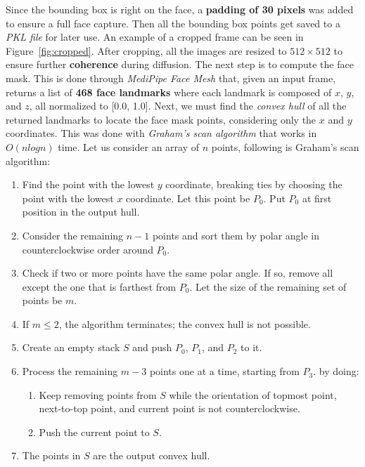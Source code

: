 \documentclass[preprint]{elsarticle}
\begin{document}
Since the bounding box is right on the face, a \textbf{padding of 30 pixels} was added to ensure a full face capture.
Then all the bounding box points get saved to a \emph{PKL file} for later use. 
An example of a cropped frame can be seen in Figure~\ref{fig:cropped}.
After cropping, all the images are resized to $512 \times 512$ to ensure further \textbf{coherence} during diffusion. 
The next step is to compute the face mask. 
This is done through \emph{MediPipe Face Mesh} that, given an input frame, returns a list of \textbf{468 face landmarks} 
where each landmark is composed of $x$, $y$, and $z$, all normalized to  [0.0, 1.0]. 
Next, we must find the \emph{convex hull} of all the returned landmarks to locate the face mask points, considering only the $x$ and $y$ coordinates. 
This was done with \emph{Graham's scan algorithm} \cite{GRAHAM1972132} that works in $O(n log n)$ time. Let us consider an array of $n$ points, following is Graham's scan algorithm:



\begin{enumerate}
	\item Find the point with the lowest $y$ coordinate, breaking ties by choosing the point with the lowest $x$ coordinate. 
	Let this point be $P_0$. Put $P_0$ at first position in the output hull.
	\item Consider the remaining $n-1$ points and sort them by polar angle in counterclockwise order around $P_0$.
	\item Check if two or more points have the same polar angle. If so, remove all except the one that is farthest from $P_0$. 
	Let the size of the remaining set of points be $m$.
	\item If $m \leq 2$, the algorithm terminates; the convex hull is not possible.
	\item Create an empty stack $S$ and push $P_0$, $P_1$, and $P_2$ to it.
	\item Process the remaining $m-3$ points one at a time, starting from $P_3$. by doing:
	\begin{enumerate}
		\item Keep removing points from $S$ while the orientation of topmost point, next-to-top point, and current point is not counterclockwise.
		\item Push the current point to $S$.
	\end{enumerate}
	\item The points in $S$ are the output convex hull.
\end{enumerate}
\end{document}
